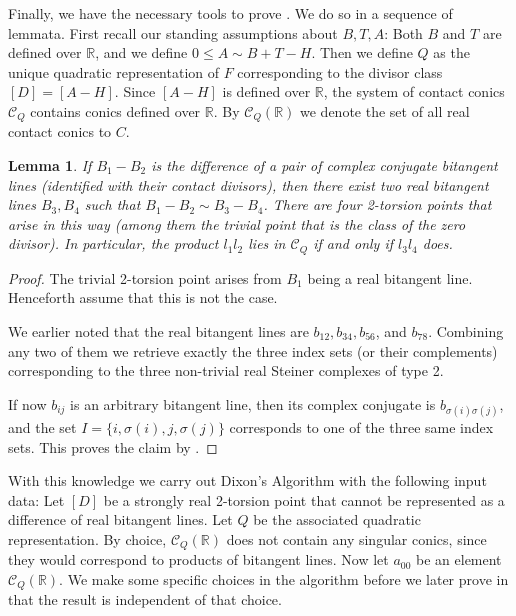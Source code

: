 \documentclass[a4paper,10pt]{amsart}
\theoremstyle{definition}
\theoremstyle{plain}
\newtheorem{lem}[Def]{Lemma}
\newcommand{\cC}{{\mathcal C}}
\newcommand{\R}{{\mathbb R}}
\begin{document}
Finally, we have the necessary tools to prove . We do so in a sequence of lemmata. First recall our standing assumptions about $B, T, A$: Both $B$ and $T$ are defined over $\R$, and we define $0 \leq A \sim B + T - H$. Then we define $Q$ as the unique quadratic representation of $F$ corresponding to the divisor class $[D] = [A - H]$. Since $[A-H]$ is defined over $\R$, the system of contact conics $\cC_Q$ contains conics defined over $\R$. By $\cC_Q(\R)$ we denote the set of all real contact conics to $C$.

\begin{lem} \label{lem:real_azyg}
    If $B_1 - B_2$ is the difference of a pair of complex conjugate bitangent lines (identified with their contact divisors), then there exist two real bitangent lines $B_3, B_4$ such that $B_1 - B_2 \sim B_3 - B_4$. There are four 2-torsion points that arise in this way (among them the trivial point that is the class of the zero divisor). In particular, the product $l_1l_2$ lies in $\cC_Q$ if and only if $l_3l_4$ does.
\end{lem}

\begin{proof}
    The trivial 2-torsion point arises from $B_1$ being a real bitangent line. Henceforth assume that this is not the case.
    
    We earlier noted that the real bitangent lines are $b_{12}, b_{34}, b_{56}$, and $b_{78}$. Combining any two of them we retrieve exactly the three index sets (or their complements) corresponding to the three non-trivial real Steiner complexes of type 2.

    If now $b_{ij}$ is an arbitrary bitangent line, then its complex conjugate is $b_{\sigma(i)\sigma(j)}$, and the set $I = \{i,\sigma(i),j,\sigma(j)\}$ corresponds to one of the three same index sets. This proves the claim by .
\end{proof}


With this knowledge we carry out Dixon's Algorithm with the following input data: Let $[D]$ be a strongly real 2-torsion point that cannot be represented as a difference of real bitangent lines. Let $Q$ be the associated quadratic representation. By choice, $\cC_Q(\R)$ does not contain any singular conics, since they would correspond to products of bitangent lines. Now let $a_{00}$ be an element $\cC_Q(\R)$. We make some specific choices in the algorithm before we later prove in  that the result is independent of that choice.
\end{document}
